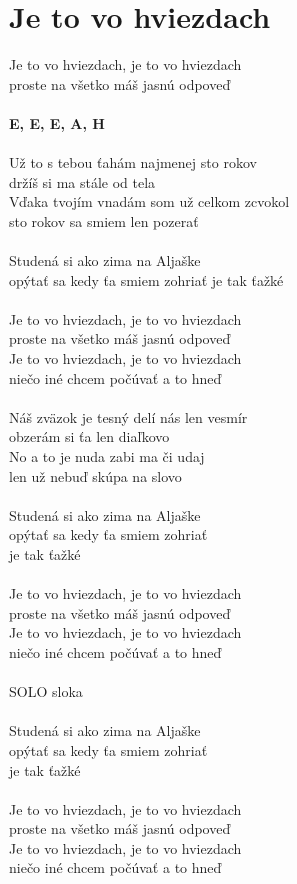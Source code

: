\section{Je to vo hviezdach}
Je to vo hviezdach, je to vo hviezdach\\
proste na všetko máš jasnú odpoveď\\
\\
\footnotesize\textbf{E, E, E, A, H}\\
\normalsize
\\
Už to s tebou ťahám najmenej sto rokov\\
držíš si ma stále od tela\\
Vďaka tvojím vnadám som už celkom zcvokol\\
sto rokov sa smiem len pozerať\\
\\
Studená si ako zima na Aljaške\\
opýtať sa kedy ťa smiem zohriať je tak ťažké\\
\\
Je to vo hviezdach, je to vo hviezdach\\
proste na všetko máš jasnú odpoveď\\
Je to vo hviezdach, je to vo hviezdach\\
niečo iné chcem počúvať a to hneď\\
\\
Náš zväzok je tesný delí nás len vesmír\\
obzerám si ťa len diaľkovo\\
No a to je nuda zabi ma či udaj\\
len už nebuď skúpa na slovo\\
\\
Studená si ako zima na Aljaške\\
opýtať sa kedy ťa smiem zohriať\\
je tak ťažké\\
\\
Je to vo hviezdach, je to vo hviezdach\\
proste na všetko máš jasnú odpoveď\\
Je to vo hviezdach, je to vo hviezdach\\
niečo iné chcem počúvať a to hneď\\
\\
SOLO sloka\\
\\
Studená si ako zima na Aljaške\\
opýtať sa kedy ťa smiem zohriať\\
je tak ťažké\\
\\
Je to vo hviezdach, je to vo hviezdach\\
proste na všetko máš jasnú odpoveď\\
Je to vo hviezdach, je to vo hviezdach\\
niečo iné chcem počúvať a to hneď